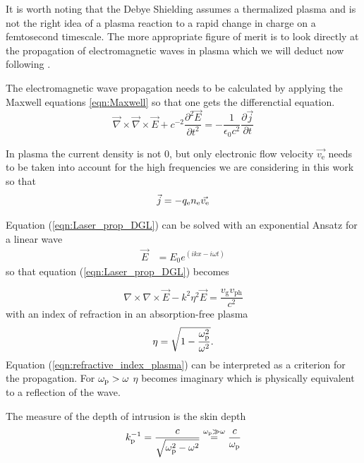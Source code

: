It is worth noting that the Debye Shielding assumes a thermalized plasma and is not the right idea of a plasma reaction to a rapid change in charge on a femtosecond timescale. 
The more appropriate figure of merit is to look directly at the propagation of electromagnetic waves in plasma which we will deduct now following \cite{mulser2010Book}.

The electromagnetic wave propagation needs to be calculated by applying the Maxwell equations \ref{eqn:Maxwell} so that one gets the differenctial equation.
\begin{equation}
\label{eqn:Laser_prop_DGL}
\vec{\nabla}\times\vec{\nabla}\times \vec{E}+c^{-2}\frac{\partial^2 \vec{E}}{\partial t^2}=-\frac{1}{\epsilon_0 c^2}\frac{\partial \vec{j}}{\partial t}
\end{equation}

In plasma the current density is not 0, but only electronic flow velocity $\vec{v_\mathrm{e}}$ needs to be taken into account for the high frequencies we are considering in this work so that 
\begin{equation}
\vec{j}=-q_\mathrm{e}n_\mathrm{e} \vec{v_\mathrm{e}}
\end{equation}

Equation (\ref{eqn:Laser_prop_DGL}) can be solved with an exponential Ansatz for a linear wave
\begin{align}
\vec{E}&=E_0 e^{(ikx-i\omega t)}
\end{align}
so that equation (\ref{eqn:Laser_prop_DGL})
becomes

\begin{equation}
\nabla \times \nabla \times \vec{E}-k^2\eta^2 \vec{E}=\frac{v_\mathrm{g}v_\mathrm{ph}}{c^2}
\end{equation}
with an index of refraction in an absorption-free plasma 
\begin{equation}
\label{eqn:refractive_index_plasma}
\eta = \sqrt{1-\frac{\omega_\mathrm{p}^2}{\omega^2}}.
\end{equation}
Equation (\ref{eqn:refractive_index_plasma}) can be interpreted as a criterion for the propagation. 
For $\omega_\mathrm{p} > \omega$ $\eta$ becomes imaginary which is physically equivalent to a reflection of the wave.

The measure of the depth of intrusion is the  skin depth 
\begin{equation}
k_\mathrm{p}^{-1}=\frac{c}{\sqrt{\omega_\mathrm{p}^2-\omega^2}}  \stackrel{\omega_\mathrm{p} \gg \omega}{=} \frac{c}{\omega_\mathrm{p}}
\end{equation}


